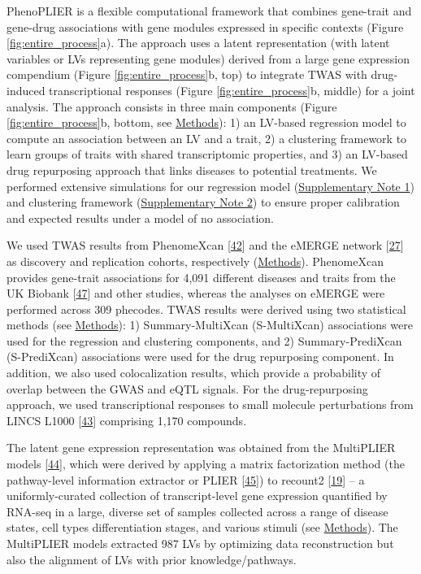 \documentclass[
  legalpaperpaper,
]{article}
\begin{document}
PhenoPLIER is a flexible computational framework that combines gene-trait and gene-drug associations with gene modules expressed in specific contexts (Figure \ref{fig:entire_process}a).
The approach uses a latent representation (with latent variables or LVs representing gene modules) derived from a large gene expression compendium (Figure \ref{fig:entire_process}b, top) to integrate TWAS with drug-induced transcriptional responses (Figure \ref{fig:entire_process}b, middle) for a joint analysis.
The approach consists in three main components (Figure \ref{fig:entire_process}b, bottom, see \protect\hyperlink{sec:methods}{Methods}):
1) an LV-based regression model to compute an association between an LV and a trait,
2) a clustering framework to learn groups of traits with shared transcriptomic properties,
and 3) an LV-based drug repurposing approach that links diseases to potential treatments.
We performed extensive simulations for our regression model (\protect\hyperlink{sm:reg:null_sim}{Supplementary Note 1}) and clustering framework (\protect\hyperlink{sm:clustering:null_sim}{Supplementary Note 2}) to ensure proper calibration and expected results under a model of no association.

We used TWAS results from PhenomeXcan {[}\protect\hyperlink{ref-lY5ln3dB}{42}{]} and the eMERGE network {[}\protect\hyperlink{ref-gZAOkumx}{27}{]} as discovery and replication cohorts, respectively (\protect\hyperlink{sec:methods:twas}{Methods}).
PhenomeXcan provides gene-trait associations for 4,091 different diseases and traits from the UK Biobank {[}\protect\hyperlink{ref-nmJxPpE5}{47}{]} and other studies, whereas the analyses on eMERGE were performed across 309 phecodes.
TWAS results were derived using two statistical methods (see \protect\hyperlink{sec:methods:predixcan}{Methods}):
1) Summary-MultiXcan (S-MultiXcan) associations were used for the regression and clustering components,
and 2) Summary-PrediXcan (S-PrediXcan) associations were used for the drug repurposing component.
In addition, we also used colocalization results, which provide a probability of overlap between the GWAS and eQTL signals.
For the drug-repurposing approach, we used transcriptional responses to small molecule perturbations from LINCS L1000 {[}\protect\hyperlink{ref-F7lIlh2N}{43}{]} comprising 1,170 compounds.

The latent gene expression representation was obtained from the MultiPLIER models {[}\protect\hyperlink{ref-14rnBunuZ}{44}{]}, which were derived by applying a matrix factorization method (the pathway-level information extractor or PLIER {[}\protect\hyperlink{ref-Ki2ij7zE}{45}{]}) to recount2 {[}\protect\hyperlink{ref-6SPTvFXq}{19}{]} -- a uniformly-curated collection of transcript-level gene expression quantified by RNA-seq in a large, diverse set of samples collected across a range of disease states, cell types differentiation stages, and various stimuli (see \protect\hyperlink{sec:methods:multiplier}{Methods}).
The MultiPLIER models extracted 987 LVs by optimizing data reconstruction but also the alignment of LVs with prior knowledge/pathways.
\end{document}
